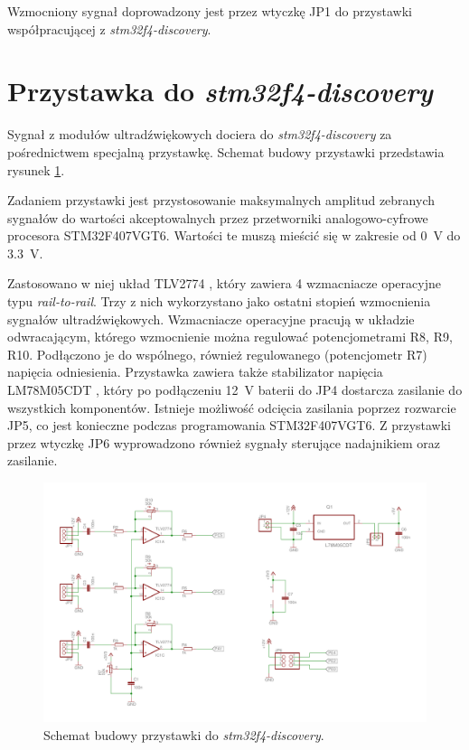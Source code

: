 Wzmocniony sygnał doprowadzony jest przez wtyczkę JP1 do przystawki współpracującej z \textit{stm32f4-discovery}.

\clearpage

\section{Przystawka do \textit{stm32f4-discovery}}

Sygnał z modułów ultradźwiękowych dociera do \textit{stm32f4-discovery} za pośrednictwem specjalną przystawkę.
Schemat budowy przystawki przedstawia rysunek \ref{fig:przystawka}.

Zadaniem przystawki jest przystosowanie maksymalnych amplitud zebranych sygnałów do wartości akceptowalnych przez  
przetworniki analogowo-cyfrowe procesora STM32F407VGT6.
Wartości te muszą mieścić się w zakresie od \SI{0}{V} do \SI{3,3}{V}.

Zastosowano w niej układ TLV2774 \cite{bib:TLV2774}, który zawiera 4 wzmacniacze operacyjne typu
\textit{rail-to-rail}. Trzy z nich wykorzystano jako ostatni stopień wzmocnienia sygnałów ultradźwiękowych. 
Wzmacniacze operacyjne pracują w układzie odwracającym, którego wzmocnienie można regulować potencjometrami R8, R9, R10. 
Podłączono je do wspólnego, również regulowanego (potencjometr R7) napięcia odniesienia.
Przystawka zawiera także stabilizator napięcia LM78M05CDT \cite{bib:LM78M05CDT}, który po podłączeniu 
\SI{12}{V} baterii do JP4 dostarcza zasilanie do wszystkich komponentów. 
Istnieje możliwość odcięcia zasilania poprzez rozwarcie JP5, co jest konieczne podczas programowania
STM32F407VGT6.
Z przystawki przez wtyczkę JP6 wyprowadzono również sygnały sterujące nadajnikiem oraz zasilanie.

 \begin{figure}[h!]
    \centering
    \includegraphics[width=1\textwidth, trim= 5mm 0mm 0mm 0mm,clip]{mainboard2}
    \caption{Schemat budowy przystawki do \textit{stm32f4-discovery}.}
    \label{fig:przystawka}
\end{figure}


